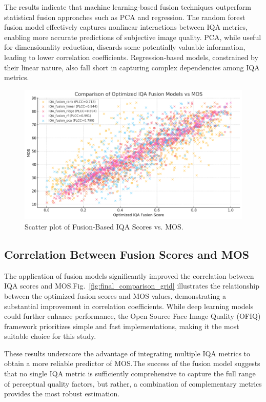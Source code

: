 The results indicate that machine learning-based fusion techniques outperform statistical fusion approaches such as PCA and regression. The random forest fusion model effectively captures nonlinear interactions between IQA metrics, enabling more accurate predictions of subjective image quality. PCA, while useful for dimensionality reduction, discards some potentially valuable information, leading to lower correlation coefficients. Regression-based models, constrained by their linear nature, also fall short in capturing complex dependencies among IQA metrics.

\begin{figure}[htbp]
    \centering
    \includegraphics[width=\linewidth]{images/fusion_model_vs_mos.png}
    \caption{Scatter plot of Fusion-Based IQA Scores vs. MOS.}\label{fig:fusion_vs_mos}
\end{figure}

\subsection{Correlation Between Fusion Scores and MOS}

The application of fusion models significantly improved the correlation between IQA scores and MOS.\@ Fig.~\ref{fig:final_comparison_grid} illustrates the relationship between the optimized fusion scores and MOS values, demonstrating a substantial improvement in correlation coefficients.
While deep learning models could further enhance performance, the Open Source Face Image Quality (OFIQ) framework prioritizes simple and fast implementations, making it the most suitable choice for this study.

These results underscore the advantage of integrating multiple IQA metrics to obtain a more reliable predictor of MOS.\@ The success of the fusion model suggests that no single IQA metric is sufficiently comprehensive to capture the full range of perceptual quality factors, but rather, a combination of complementary metrics provides the most robust estimation.

